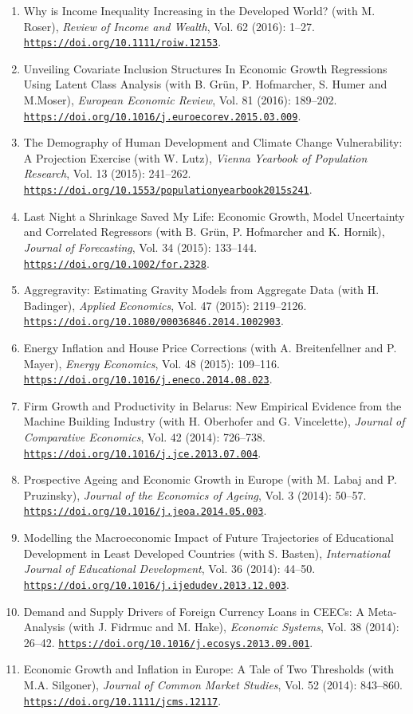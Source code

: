 \documentclass[10pt]{res} %
\newcommand{\doiurl}[1]{\href{https://doi.org/#1}{\nolinkurl{https://doi.org/#1}}}
\begin{document}
\begin{resume}
\begin{enumerate}
\item Why is Income Inequality Increasing in the Developed World? (with M. Roser), \textit{Review of Income and Wealth}, Vol. 62 (2016): 1--27. \doiurl{10.1111/roiw.12153}.
\item Unveiling Covariate Inclusion Structures In Economic Growth Regressions Using Latent Class Analysis (with B. Gr\"un, P. Hofmarcher, S. Humer and M.Moser),\textit{ European Economic Review}, Vol. 81 (2016): 189--202. \doiurl{10.1016/j.euroecorev.2015.03.009}.
\item The Demography of Human Development and Climate Change Vulnerability: A Projection Exercise (with W. Lutz), \textit{Vienna Yearbook of Population Research}, Vol. 13 (2015): 241--262. \doiurl{10.1553/populationyearbook2015s241}.
\item Last Night a Shrinkage Saved My Life: Economic Growth, Model Uncertainty and Correlated Regressors (with B. Gr\"un, P. Hofmarcher and K. Hornik), \textit{Journal of Forecasting}, Vol. 34 (2015): 133--144. \doiurl{10.1002/for.2328}.
\item Aggregravity: Estimating Gravity Models from Aggregate Data (with H. Badinger), \textit{Applied Economics}, Vol. 47 (2015): 2119--2126. \doiurl{10.1080/00036846.2014.1002903}.
\item Energy Inflation and House Price Corrections (with A. Breitenfellner and P. Mayer), \textit{Energy Economics}, Vol. 48 (2015): 109--116. \doiurl{10.1016/j.eneco.2014.08.023}.
\item Firm Growth and Productivity in Belarus: New Empirical Evidence from the Machine Building Industry (with H. Oberhofer and G. Vincelette), \textit{Journal of Comparative Economics}, Vol. 42 (2014): 726--738. \doiurl{10.1016/j.jce.2013.07.004}.
\item Prospective Ageing and Economic Growth in Europe (with M. Labaj and P. Pruzinsky), \textit{Journal of the Economics of Ageing}, Vol. 3 (2014): 50--57. \doiurl{10.1016/j.jeoa.2014.05.003}.
\item Modelling the Macroeconomic Impact of Future Trajectories of Educational Development in Least Developed Countries (with S. Basten), \textit{International Journal of Educational Development}, Vol. 36 (2014): 44--50. \doiurl{10.1016/j.ijedudev.2013.12.003}.
\item Demand and Supply Drivers of Foreign Currency Loans in CEECs: A Meta-Analysis (with J. Fidrmuc and M. Hake), \textit{Economic Systems}, Vol. 38 (2014): 26--42. \doiurl{10.1016/j.ecosys.2013.09.001}.
\item Economic Growth and Inflation in Europe: A Tale of Two Thresholds (with M.A. Silgoner),\textit{ Journal of Common Market Studies}, Vol. 52 (2014): 843--860. \doiurl{10.1111/jcms.12117}.

\end{enumerate}
\end{resume}
\end{document}
